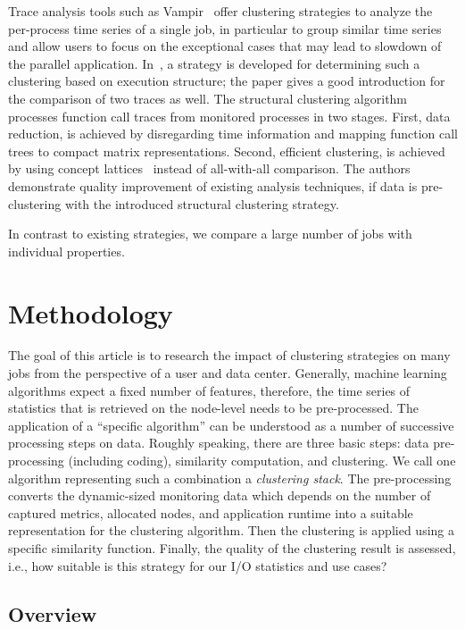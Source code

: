 \documentclass{jhps}
\begin{document}
Trace analysis tools such as Vampir~\cite{nagel1996vampir} offer clustering strategies to analyze the per-process time series of a single job, in particular to group similar time series and allow users to focus on the exceptional cases that may lead to slowdown of the parallel application.
In~\cite{weber2016structural}, a strategy is developed for determining such a clustering based on execution structure; the paper gives a good introduction for the comparison of two traces as well.
The structural clustering algorithm processes function call traces from monitored processes in two stages.
First, data reduction, is achieved by disregarding time information and mapping function call trees to compact matrix representations.
Second, efficient clustering, is achieved by using concept lattices~\cite{ganter1999formal} instead of all-with-all comparison.
The authors demonstrate quality improvement of existing analysis techniques, if data is pre-clustering with the introduced structural clustering strategy.

In contrast to existing strategies, we compare a large number of jobs with individual properties.

\section{Methodology}%
\label{sec:methodology}

The goal of this article is to research the impact of clustering strategies on many jobs from the perspective of a user and data center.
Generally, machine learning algorithms expect a fixed number of features, therefore, the time series of statistics that is retrieved on the node-level needs to be pre-processed.
The application of a “specific algorithm” can be understood as a number of successive processing steps on data.
Roughly speaking, there are three basic steps: data pre-processing (including coding), similarity computation, and clustering.
We call one algorithm representing such a combination a \textit{clustering stack}.
The pre-processing converts the dynamic-sized monitoring data which depends on the number of captured metrics, allocated nodes, and application runtime into a suitable representation for the clustering algorithm.
Then the clustering is applied using a specific similarity function.
Finally, the quality of the clustering result is assessed, i.e., how suitable is this strategy for our I/O statistics and use cases?

\subsection{Overview}
\end{document}
